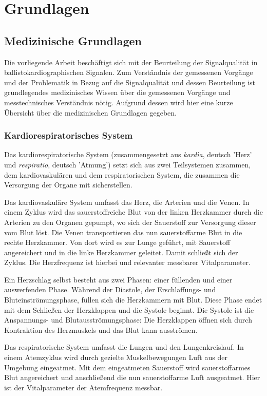 \chapter{Grundlagen}\label{grundlagen}

\section{Medizinische Grundlagen}

Die vorliegende Arbeit beschäftigt sich mit der Beurteilung der Signalqualität in ballistokardiographischen Signalen. Zum Verständnis der gemessenen Vorgänge und der Problematik in Bezug auf die Signalqualität und dessen Beurteilung ist grundlegendes medizinisches Wissen über die gemessenen Vorgänge und messtechnisches Verständnis nötig. Aufgrund dessen wird hier eine kurze Übersicht über die medizinischen Grundlagen gegeben.

	\subsection{Kardiorespiratorisches System}
	
	Das kardiorespiratorische System (zusammengesetzt aus \textit{kardìa}, deutsch 'Herz' und \textit{respiratio}, deutsch 'Atmung') setzt sich aus zwei Teilsystemen zusammen, dem kardiovaskulären und dem respiratorischen System, die zusammen die Versorgung der Organe mit sicherstellen.
	
	Das kardiovaskuläre System umfasst das Herz, die Arterien und die Venen. In einem Zyklus wird das sauerstoffreiche Blut von der linken Herzkammer durch die Arterien zu den Organen gepumpt, wo sich der Sauerstoff zur Versorgung dieser vom Blut löst. Die Venen transportieren das nun sauerstoffarme Blut in die rechte Herzkammer. Von dort wird es zur Lunge geführt, mit Sauerstoff angereichert und in die linke Herzkammer geleitet. Damit schließt sich der Zyklus. Die Herzfrequenz ist hierbei und relevanter messbarer Vitalparameter.
	
	Ein Herzschlag selbst besteht aus zwei Phasen: einer füllenden und einer auswerfenden Phase. Während der Diastole, der Erschlaffungs- und Bluteinströmungsphase, füllen sich die Herzkammern mit Blut. Diese Phase endet mit dem Schließen der Herzklappen und die Systole beginnt. Die Systole ist die Anspannungs- und Blutausströmungsphase: Die Herzklappen öffnen sich durch Kontraktion des Herzmuskels und das Blut kann ausströmen.
	
	Das respiratorische System umfasst die Lungen und den Lungenkreislauf. In einem Atemzyklus wird durch gezielte Muskelbewegungen Luft aus der Umgebung eingeatmet. Mit dem eingeatmeten Sauerstoff wird sauerstoffarmes Blut angereichert und anschließend die nun sauerstoffarme Luft ausgeatmet. Hier ist der Vitalparameter der Atemfrequenz messbar.


